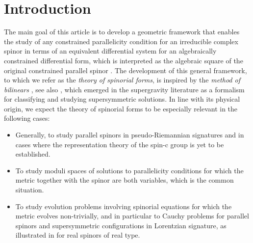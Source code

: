 \documentclass[10pt,a4paper,twoside,reqno]{amsart}
\theoremstyle{plain}
\theoremstyle{definition}
\theoremstyle{remark}
\begin{document}
\maketitle

\setcounter{tocdepth}{1} %

\tableofcontents


\section{Introduction}


The main goal of this article is to develop a geometric framework that enables the study of any constrained parallelicity condition for an irreducible complex spinor in terms of an equivalent differential system for an algebraically constrained differential form, which is interpreted as the algebraic square of the original constrained parallel spinor \cite{AtiyahSeminar,Algebraic_Complex_Square_2025,Krasnov2024}. The development of this general framework, to which we refer as the \emph{theory of spinorial forms}, is inspired by the \emph{method of bilinears} \cite{Tod:1983pm,Gauntlett:2002nw,Gutowski:2003rg,Meessen:2006tu}, see also \cite{Ortin:2015hya,Tomasiello:2022dwe}, which emerged in the supergravity literature as a formalism for classifying and studying supersymmetric solutions. In line with its physical origin, we expect the theory of spinorial forms to be especially relevant in the following cases:

\begin{itemize}
    \item Generally, to study parallel spinors in pseudo-Riemannian signatures and in cases where the representation theory of the spin-c group is yet to be established.

    \item To study moduli spaces of solutions to parallelicity conditions for which the metric together with the spinor are both variables, which is the common situation.

    \item To study evolution problems involving spinorial equations for which the metric evolves non-trivially, and in particular to Cauchy problems for parallel spinors and supersymmetric configurations in Lorentzian signature, as illustrated in \cite{Murcia:2020zig,Murcia:2021dur,ShahbaziThesis} for real spinors of real type.
\end{itemize}
\end{document}
